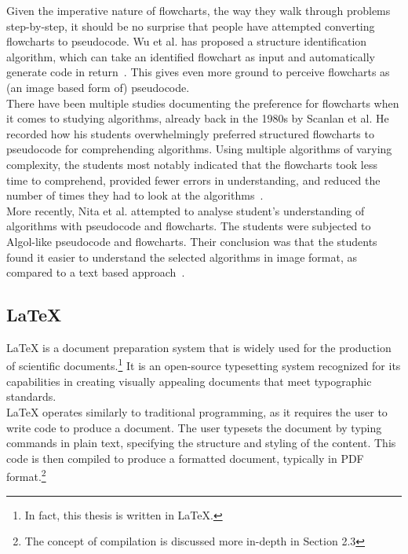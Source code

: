 Given the imperative nature of flowcharts, the way they walk through problems step-by-step, it should be no surprise that people have attempted converting flowcharts to pseudocode. Wu et al. has proposed a structure identification algorithm, which can take an identified flowchart as input and automatically generate code in return~\cite{codeFromFlowcharts}. This gives even more ground to perceive flowcharts as (an image based form of) pseudocode. \\

There have been multiple studies documenting the preference for flowcharts when it comes to studying algorithms, already back in the 1980s by Scanlan et al. He recorded how his students overwhelmingly preferred structured flowcharts to pseudocode for comprehending algorithms. Using multiple algorithms of varying complexity, the students most notably indicated that the flowcharts took less time to comprehend, provided fewer errors in understanding, and reduced the number of times they had to look at the algorithms~\cite{flowchartsAreGood1}. \\

More recently, Nita et al. attempted to analyse student's understanding of algorithms with pseudocode and flowcharts. The students were subjected to Algol-like pseudocode and flowcharts. Their conclusion was that the students found it easier to understand the selected algorithms in image format, as compared to a text based approach~\cite{flowchartsAreGood4}.

\subsection{LaTeX}

LaTeX is a document preparation system that is widely used for the production of scientific documents.\footnote{In fact, this thesis is written in LaTeX.} It is an open-source typesetting system recognized for its capabilities in creating visually appealing documents that meet typographic standards. \\

LaTeX operates similarly to traditional programming, as it requires the user to write code to produce a document. The user typesets the document by typing commands in plain text, specifying the structure and styling of the content. This code is then compiled to produce a formatted document, typically in PDF format.\footnote{The concept of compilation is discussed more in-depth in Section 2.3} \\

